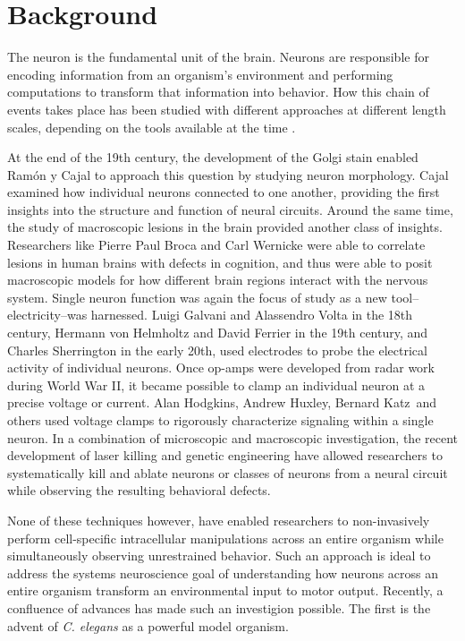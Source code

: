 \section{Background}
The neuron is the fundamental unit of the brain.  Neurons are responsible for encoding information from an organism's environment and performing computations to transform that information into  behavior.  How this chain of events takes place has been studied with different approaches at different length scales, depending on the tools available at the time \citep{finger_origins_2001, kandel_essentials_1995}.

At the end of the 19th century, the development of the Golgi stain enabled Ram\'on y Cajal to approach this question by studying neuron morphology.  Cajal examined how individual neurons connected to one another, providing the first insights into the structure and function of neural circuits. Around the same time, the study of macroscopic  lesions in the brain provided another class of insights. Researchers like Pierre Paul Broca and Carl Wernicke were able to correlate lesions in human brains with defects in cognition, and thus were able to posit macroscopic models for how different brain regions interact with the nervous system. Single neuron function was again the focus of study as a new tool--electricity--was harnessed.  Luigi Galvani and Alassendro Volta in the 18th century, Hermann von Helmholtz and David Ferrier in the 19th century, and Charles Sherrington in the early 20th, used electrodes to probe the electrical activity of individual neurons. Once  op-amps were developed from radar work during  World War II, it became possible to clamp an individual neuron at a precise voltage or current. Alan Hodgkins, Andrew Huxley, Bernard Katz and others used voltage clamps to rigorously characterize signaling within a single neuron. In a combination of microscopic and macroscopic investigation, the recent development of laser killing and genetic engineering have allowed researchers to systematically kill and ablate neurons or classes of neurons from a neural circuit while observing the resulting behavioral defects. 

None of these techniques however, have enabled researchers to non-invasively perform cell-specific intracellular manipulations  across an entire organism while simultaneously observing unrestrained behavior.  Such an approach is ideal to address the systems neuroscience goal of understanding how neurons across an entire  organism  transform an environmental input to motor output.  Recently, a confluence of advances has made such an investigion possible. The first is the advent of \textit{C. elegans} as a powerful model organism.

